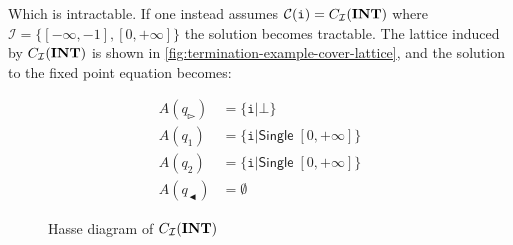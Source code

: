 Which is intractable.
If one instead assumes $\mathcal{C}(\texttt{i}) = C_\mathcal{I}(\mathbf{INT})$ where $\mathcal{I} = \{[-\infty, - 1], [0, +\infty]\}$ the solution becomes tractable.
The lattice induced by $C_\mathcal{I}(\mathbf{INT})$ is shown in \autoref{fig:termination-example-cover-lattice}, and the solution to the fixed point equation becomes:

\begin{align}
    A(q_\whitepointerright) &= \{ \texttt{i} | \bot \} \\
    A(q_1) &= \{ \texttt{i} | \mathsf{Single} \; [0, +\infty] \} \\
    A(q_2) &= \{ \texttt{i} | \mathsf{Single} \; [0, +\infty] \} \\
    A(q_\blackpointerleft) &= \emptyset
\end{align}

\begin{figure}
    \centering
    
    \caption{Hasse diagram of $C_\mathcal{I}(\mathbf{INT})$}
    \label{fig:termination-example-cover-lattice}
\end{figure}

